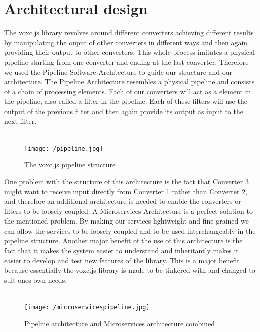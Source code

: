 \documentclass[english]{article}
\begin{document}
	\section{Architectural design}
	The voxc.js library revolves around different converters achieving different results by manipulating the ouput of other converters in different ways and then again providing their output to other converters.  This whole process imitates a physical pipeline starting from one converter and ending at the last converter.  Therefore we used the Pipeline Software Architecture to guide our structure and our architecture.  The Pipeline Architecture resembles a physical pipeline and consists of a chain of processing elements.  Each of our converters will act as a element in the pipeline, also called a filter in the pipeline.  Each of these filters will use the output of the previous filter and then again provide its output as input to the next filter.\\\\
	\begin{figure}[h]
		\texttt{[image: /pipeline.jpg]}
		\caption{The voxc.js pipeline structure }
	\end{figure}
	One problem with the structure of this architecture is the fact that Converter 3 might want to receive input directly from Converter 1 rather than Converter 2, and therefore an additional architecture is needed to enable the converters or filters to be loosely coupled.  A Microservices Architecture is a perfect solution to the mentioned problem.  By making our services lightweight and fine-grained we can allow the services to be loosely coupled and to be used interchangeably in the pipeline structure.  Another major benefit of the use of this architecture is the fact that it makes the system easier to understand and inheritantly makes it easier to develop and test new features of the library.  This is a major benefit because essentially the voxc.js library is made to be tinkered with and changed to suit ones own needs.\\\\
	\begin{figure}[h]
		\texttt{[image: /microservicespipeline.jpg]}
		\caption{Pipeline architecture and Microservices architecture combined }
	\end{figure}
\end{document}
